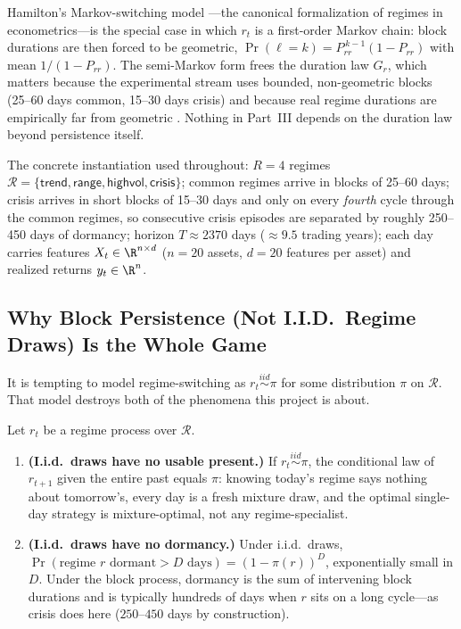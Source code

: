 Hamilton's Markov-switching model \citep{hamilton1989new}---the canonical
formalization of regimes in econometrics---is the special case in which $r_t$
is a first-order Markov chain: block durations are then forced to be
geometric, $\Pr(\ell = k) = P_{rr}^{\,k-1}(1 - P_{rr})$ with mean
$1/(1 - P_{rr})$. The semi-Markov form frees the duration law $G_r$, which
matters because the experimental stream uses bounded, non-geometric blocks
(25--60 days common, 15--30 days crisis) and because real regime durations
are empirically far from geometric \citep{ang2012regime, guidolin2007asset}.
Nothing in Part~III depends on the duration law beyond persistence itself.

The concrete instantiation used throughout: $R = 4$ regimes
$\mathcal{R} = \{\textsf{trend}, \textsf{range}, \textsf{highvol},
\textsf{crisis}\}$; common regimes arrive in blocks of 25--60 days;
\textsf{crisis} arrives in short blocks of 15--30 days and only on every
\emph{fourth} cycle through the common regimes, so consecutive crisis
episodes are separated by roughly 250--450 days of dormancy; horizon
$T \approx 2370$ days ($\approx 9.5$ trading years); each day carries
features $X_t \in \R^{n \times d}$ ($n = 20$ assets, $d = 20$ features per
asset) and realized returns $y_t \in \R^{n}$.

\subsection{Why Block Persistence (Not I.I.D.\ Regime Draws) Is the Whole Game}

It is tempting to model regime-switching as $r_t \stackrel{iid}{\sim} \pi$
for some distribution $\pi$ on $\mathcal{R}$. That model destroys both of the
phenomena this project is about.

\begin{proposition}
\label{prop:dd2-persistence}
Let $r_t$ be a regime process over $\mathcal{R}$.
\begin{enumerate}
  \item \textbf{(I.i.d.\ draws have no usable present.)} If
        $r_t \stackrel{iid}{\sim} \pi$, the conditional law of $r_{t+1}$
        given the entire past equals $\pi$: knowing today's regime says
        nothing about tomorrow's, every day is a fresh mixture draw, and the
        optimal single-day strategy is mixture-optimal, not any
        regime-specialist.
  \item \textbf{(I.i.d.\ draws have no dormancy.)} Under i.i.d.\ draws,
        $\Pr(\text{regime } r \text{ dormant} > D \text{ days})
        = (1 - \pi(r))^{D}$, exponentially small in $D$. Under the block
        process, dormancy is the sum of intervening block durations and is
        typically hundreds of days when $r$ sits on a long cycle---as
        \textsf{crisis} does here ($250$--$450$ days by construction).
\end{enumerate}
\end{proposition}

